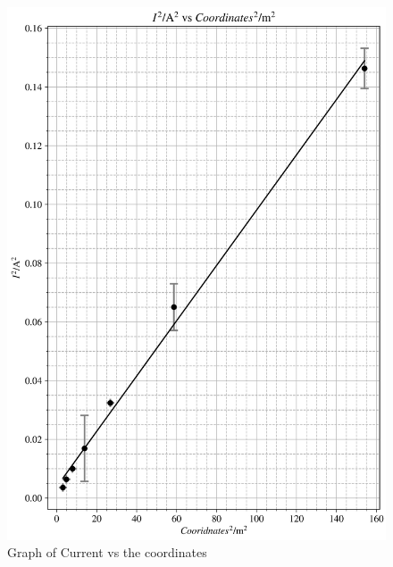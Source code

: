 \documentclass[12pt, a4paper]{article}
\begin{document}
\begin{figure}
    \centering
    \includegraphics[width=\textwidth]{I2vsCo-or2.png}
    \caption{Graph of Current vs the coordinates}
    \label{fig:I2vsCoor}
\end{figure}
\end{document}
